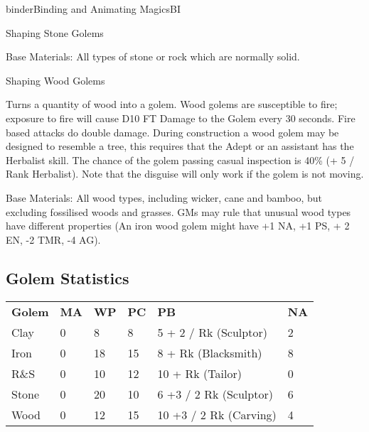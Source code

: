 \begin{college}[1.1]{binder}{Binding and Animating Magics}{BI}
\begin{ritual}[R-6]{Shaping Stone Golems}
\begin{effects}
Base Materials: All types of stone or rock which are normally solid.
\end{effects}
\end{ritual}

\begin{ritual}[R-7]{Shaping Wood Golems}

\materialcost{100 sp}
\begin{effects}
Turns a quantity of wood into a golem.  Wood golems are susceptible to
fire; exposure to fire will cause D10 FT Damage to the Golem every 30
seconds.  Fire based attacks do double damage.  During construction a
wood golem may be designed to resemble a tree, this requires that the
Adept or an assistant has the Herbalist skill.  The chance of the
golem passing casual inspection is 40\% (+ 5 / Rank Herbalist).  Note
that the disguise will only work if the golem is not moving.

Base Materials: All wood types, including wicker, cane and bamboo, but
excluding fossilised woods and grasses.  GMs may rule that unusual
wood types have different properties (\eg An iron wood golem might
have +1 NA, +1 PS, + 2 EN, -2 TMR, -4 AG).
\end{effects}
\end{ritual}

\begin{table*}[h]
\subsection{Golem Statistics}

\begin{tabular}{llllll}
\textbf{Golem}  & \textbf{MA} & \textbf{WP} & \textbf{PC}  & \textbf{PB} & \textbf{NA} \\
Clay   &  0 &  8 &  8  &  5 + 2 / Rk (Sculptor) &  2 \\
Iron   &  0 & 18 & 15  &  8 + Rk (Blacksmith)	&  8 \\
R\&S   &  0 & 10 & 12  & 10 + Rk (Tailor)	&  0 \\
Stone  &  0 & 20 & 10  &  6 +3 / 2 Rk (Sculptor)&  6 \\
Wood   &  0 & 12 & 15  & 10 +3 / 2 Rk (Carving)	&  4 \\
\end{tabular}

\bigskip


\end{table*}
\end{college}
